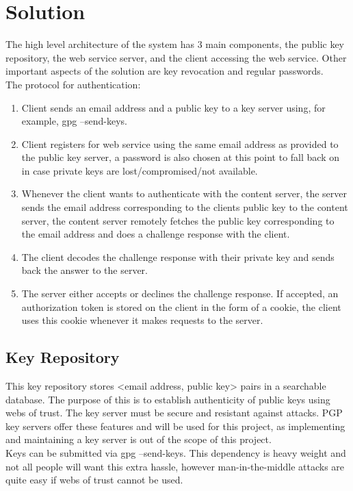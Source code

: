 \documentclass[11pt]{article}
\begin{document}
\section{Solution} \label{sec:sol}
The high level architecture of the system has 3 main components, the public key repository, the web service server, and the client accessing the web service. Other important aspects of the solution are key revocation and regular passwords. \\
The protocol for authentication:
\begin{enumerate}
	\item Client sends an email address and a public key to a key server using, for example, gpg --send-keys.
	\item Client registers for web service using the same email address as provided to the public key server, a password is also chosen at this point to fall back on in case private keys are lost/compromised/not available.
	\item Whenever the client wants to authenticate with the content server, the server sends the email address corresponding to the clients public key to the content server, the content server remotely fetches the public key corresponding to the email address and does a challenge response with the client.
	\item The client decodes the challenge response with their private key and sends back the answer to the server.
	\item The server either accepts or declines the challenge response. If accepted, an authorization token is stored on the client in the form of a cookie, the client uses this cookie whenever it makes requests to the server.
\end{enumerate}

\subsection{Key Repository} \label{sec:sol_key_repository}
This key repository stores <email address, public key> pairs in a searchable database. The purpose of this is to establish authenticity of public keys using webs of trust. The key server must be secure and resistant against attacks. PGP key servers offer these features and will be used for this project, as implementing and maintaining a key server is out of the scope of this project. \\
Keys can be submitted via gpg --send-keys. This dependency is heavy weight and not all people will want this extra hassle, however man-in-the-middle attacks are quite easy if webs of trust cannot be used. \\
\end{document}
